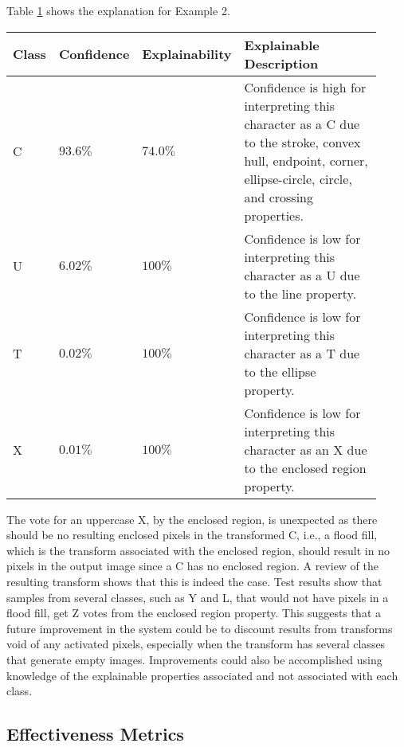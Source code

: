 Table \ref{table:emnist_example2_explanation} shows the explanation for Example 2.

\begin{table}[H]
    \renewcommand{\arraystretch}{1.3}
     \label{table:emnist_example2_explanation}
    \begin{center}
    \begin{tabular}{| m{0.06\linewidth} | m{0.14\linewidth} | m{0.17\linewidth} | m{0.55\linewidth} |}
    \hline
     Class & Confidence & Explainability & Explainable Description \\
    \hline \hline
    C & $93.6\%$ & $74.0\%$ & Confidence is high for interpreting this character as a C due to the stroke, convex hull, endpoint, corner, ellipse-circle, circle, and crossing properties. \\ 
    \hline
    U & $6.02\%$ & $100\%$ & Confidence is low for interpreting this character as a U due to the line property. \\
    \hline
    T & $0.02\%$ & $100\%$ & Confidence is low for interpreting this character as a T due to the ellipse property. \\
    \hline
    X & $0.01\%$ & $100\%$ & Confidence is low for interpreting this character as an X due to the enclosed region property. \\ 
    \hline
    \end{tabular}
    \end{center}
\end{table}

The vote for an uppercase X, by the enclosed region, is unexpected as there
should be no resulting enclosed pixels in the transformed C, i.e., a flood fill,
which is the transform associated with the enclosed region, should result in no
pixels in the output image since a C has no enclosed region. A review of the
resulting transform shows that this is indeed the case.  Test results show that
samples from several classes, such as Y and L, that would not have pixels in a
flood fill, get Z votes from the enclosed region property.  This suggests that a
future improvement in the system could be to discount results from transforms
void of any activated pixels, especially when the transform has several classes
that generate empty images.  Improvements could also be accomplished using
knowledge of the explainable properties associated and not associated with each
class.


\subsection{Effectiveness Metrics}

